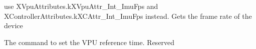 \begin{DoxyRefList}
\item[\label{deprecated__deprecated000007}%
\Hypertarget{deprecated__deprecated000007}%
Member \mbox{\hyperlink{class_ximmerse_1_1_input_system_1_1_x_device_plugin_ab7f817a86e5b3af956089fb089b7d0c3aa3ca38d7e2eb48ca8844decfa6cea1c7}{Ximmerse.Input\+System.X\+Device\+Plugin.k\+X\+Act\+\_\+\+Get\+Int\+\_\+\+F\+PS}} ]use X\+Vpu\+Attributes.\+k\+X\+Vpu\+Attr\+\_\+\+Int\+\_\+\+Imu\+Fps and X\+Controller\+Attributes.\+k\+X\+C\+Attr\+\_\+\+Int\+\_\+\+Imu\+Fps instead. Gets the frame rate of the device  
\item[\label{deprecated__deprecated000031}%
\Hypertarget{deprecated__deprecated000031}%
Member \mbox{\hyperlink{class_ximmerse_1_1_input_system_1_1_x_device_plugin_ab7f817a86e5b3af956089fb089b7d0c3a6ee7ab4830eb746cbccf5630eeef0053}{Ximmerse.Input\+System.X\+Device\+Plugin.k\+X\+Act\+\_\+\+Get\+Int\+\_\+\+Paired\+Number}} ]The command to set the V\+PU reference time. Reserved 


\end{DoxyRefList}
